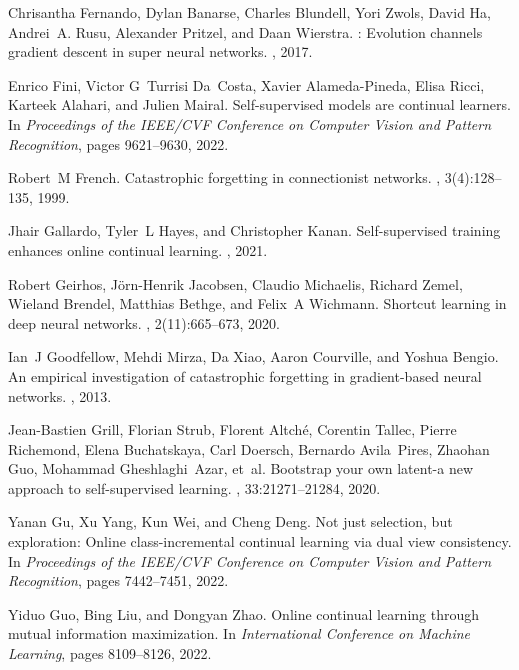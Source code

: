 \documentclass[10pt,twocolumn,letterpaper]{article}
\begin{document}
{\begin{thebibliography}{10}
Chrisantha Fernando, Dylan Banarse, Charles Blundell, Yori Zwols, David Ha,
  Andrei~A. Rusu, Alexander Pritzel, and Daan Wierstra.
: Evolution channels gradient descent in super neural
  networks.
, 2017.

Enrico Fini, Victor G~Turrisi Da~Costa, Xavier Alameda-Pineda, Elisa Ricci,
  Karteek Alahari, and Julien Mairal.
\newblock Self-supervised models are continual learners.
\newblock In {\em Proceedings of the IEEE/CVF Conference on Computer Vision and
  Pattern Recognition}, pages 9621--9630, 2022.

Robert~M French.
\newblock Catastrophic forgetting in connectionist networks.
, 3(4):128--135, 1999.

Jhair Gallardo, Tyler~L Hayes, and Christopher Kanan.
\newblock Self-supervised training enhances online continual learning.
, 2021.

Robert Geirhos, J{\"o}rn-Henrik Jacobsen, Claudio Michaelis, Richard Zemel,
  Wieland Brendel, Matthias Bethge, and Felix~A Wichmann.
\newblock Shortcut learning in deep neural networks.
, 2(11):665--673, 2020.

Ian~J Goodfellow, Mehdi Mirza, Da Xiao, Aaron Courville, and Yoshua Bengio.
\newblock An empirical investigation of catastrophic forgetting in
  gradient-based neural networks.
, 2013.

Jean-Bastien Grill, Florian Strub, Florent Altch{\'e}, Corentin Tallec, Pierre
  Richemond, Elena Buchatskaya, Carl Doersch, Bernardo Avila~Pires, Zhaohan
  Guo, Mohammad Gheshlaghi~Azar, et~al.
\newblock Bootstrap your own latent-a new approach to self-supervised learning.
,
  33:21271--21284, 2020.

Yanan Gu, Xu Yang, Kun Wei, and Cheng Deng.
\newblock Not just selection, but exploration: Online class-incremental
  continual learning via dual view consistency.
\newblock In {\em Proceedings of the IEEE/CVF Conference on Computer Vision and
  Pattern Recognition}, pages 7442--7451, 2022.

Yiduo Guo, Bing Liu, and Dongyan Zhao.
\newblock Online continual learning through mutual information maximization.
\newblock In {\em International Conference on Machine Learning}, pages
  8109--8126, 2022.


\end{thebibliography}}
\end{document}
